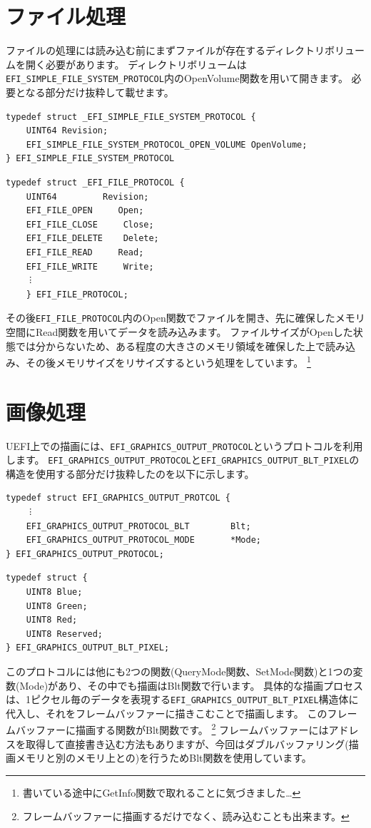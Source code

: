 \documentclass[10pt, b5paper, openany]{ltjsbook}
\begin{document}
\section{ファイル処理}
ファイルの処理には読み込む前にまずファイルが存在するディレクトリボリュームを開く必要があります。
ディレクトリボリュームは\verb+EFI_SIMPLE_FILE_SYSTEM_PROTOCOL+内のOpenVolume関数を用いて開きます。
必要となる部分だけ抜粋して載せます。
\begin{lstlisting}[caption=EFI\_SIMPLE\_FILE\_SYSTEM\_PROTOCOL,label=efi_simple_file_system_protocol]
typedef struct _EFI_SIMPLE_FILE_SYSTEM_PROTOCOL {
    UINT64 Revision;
    EFI_SIMPLE_FILE_SYSTEM_PROTOCOL_OPEN_VOLUME OpenVolume;
} EFI_SIMPLE_FILE_SYSTEM_PROTOCOL
\end{lstlisting}
\begin{lstlisting}[caption=EFI\_FILE\_PROTOCOL,label=efi_file_protocol]
typedef struct _EFI_FILE_PROTOCOL {
    UINT64         Revision;
    EFI_FILE_OPEN     Open;
    EFI_FILE_CLOSE     Close;
    EFI_FILE_DELETE    Delete;
    EFI_FILE_READ     Read;
    EFI_FILE_WRITE     Write;
    ︙
    } EFI_FILE_PROTOCOL;
\end{lstlisting}    
その後\verb+EFI_FILE_PROTOCOL+内のOpen関数でファイルを開き、先に確保したメモリ空間にRead関数を用いてデータを読み込みます。
ファイルサイズがOpenした状態では分からないため、ある程度の大きさのメモリ領域を確保した上で読み込み、その後メモリサイズをリサイズするという処理をしています。
\footnote{書いている途中にGetInfo関数で取れることに気づきました…}

\section{画像処理}
UEFI上での描画には、\verb+EFI_GRAPHICS_OUTPUT_PROTOCOL+というプロトコルを利用します。
\verb+EFI_GRAPHICS_OUTPUT_PROTOCOL+と\verb+EFI_GRAPHICS_OUTPUT_BLT_PIXEL+の構造を使用する部分だけ抜粋したのを以下に示します。
\begin{lstlisting}[caption=EFI\_GRAPHICS\_OUTPUT\_PROTOCOL,label=efi_gop]
typedef struct EFI_GRAPHICS_OUTPUT_PROTCOL {
    ︙
    EFI_GRAPHICS_OUTPUT_PROTOCOL_BLT        Blt;
    EFI_GRAPHICS_OUTPUT_PROTOCOL_MODE       *Mode;
} EFI_GRAPHICS_OUTPUT_PROTOCOL;
\end{lstlisting}
\begin{lstlisting}[caption=EFI\_GRAPHICS\_OUTPUT\_BLT\_PIXEL+,label=efi_gobp]
typedef struct {
    UINT8 Blue;
    UINT8 Green;
    UINT8 Red;
    UINT8 Reserved;
} EFI_GRAPHICS_OUTPUT_BLT_PIXEL;
\end{lstlisting}
このプロトコルには他にも2つの関数(QueryMode関数、SetMode関数)と1つの変数(Mode)があり、その中でも描画はBlt関数で行います。
具体的な描画プロセスは、1ピクセル毎のデータを表現する\verb+EFI_GRAPHICS_OUTPUT_BLT_PIXEL+構造体に代入し、それをフレームバッファーに描きこむことで描画します。
このフレームバッファーに描画する関数がBlt関数です。
\footnote{フレームバッファーに描画するだけでなく、読み込むことも出来ます。}
フレームバッファーにはアドレスを取得して直接書き込む方法もありますが、今回はダブルバッファリング(描画メモリと別のメモリ上との)を行うためBlt関数を使用しています。
\end{document}
